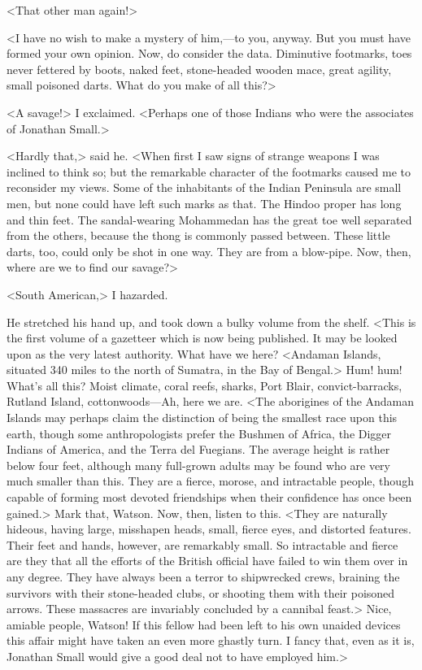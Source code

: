<That other man again!>

<I have no wish to make a mystery of him,—to you, anyway. But you must have formed your own opinion. Now, do consider the data. Diminutive footmarks, toes never fettered by boots, naked feet, stone-headed wooden mace, great agility, small poisoned darts. What do you make of all this?>

<A savage!> I exclaimed. <Perhaps one of those Indians who were the associates of Jonathan Small.>

<Hardly that,> said he. <When first I saw signs of strange weapons I was inclined to think so; but the remarkable character of the footmarks caused me to reconsider my views. Some of the inhabitants of the Indian Peninsula are small men, but none could have left such marks as that. The Hindoo proper has long and thin feet. The sandal-wearing Mohammedan has the great toe well separated from the others, because the thong is commonly passed between. These little darts, too, could only be shot in one way. They are from a blow-pipe. Now, then, where are we to find our savage?>

<South American,> I hazarded.

He stretched his hand up, and took down a bulky volume from the shelf. <This is the first volume of a gazetteer which is now being published. It may be looked upon as the very latest authority. What have we here? <Andaman Islands, situated 340 miles to the north of Sumatra, in the Bay of Bengal.> Hum! hum! What's all this? Moist climate, coral reefs, sharks, Port Blair, convict-barracks, Rutland Island, cottonwoods—Ah, here we are. <The aborigines of the Andaman Islands may perhaps claim the distinction of being the smallest race upon this earth, though some anthropologists prefer the Bushmen of Africa, the Digger Indians of America, and the Terra del Fuegians. The average height is rather below four feet, although many full-grown adults may be found who are very much smaller than this. They are a fierce, morose, and intractable people, though capable of forming most devoted friendships when their confidence has once been gained.> Mark that, Watson. Now, then, listen to this. <They are naturally hideous, having large, misshapen heads, small, fierce eyes, and distorted features. Their feet and hands, however, are remarkably small. So intractable and fierce are they that all the efforts of the British official have failed to win them over in any degree. They have always been a terror to shipwrecked crews, braining the survivors with their stone-headed clubs, or shooting them with their poisoned arrows. These massacres are invariably concluded by a cannibal feast.> Nice, amiable people, Watson! If this fellow had been left to his own unaided devices this affair might have taken an even more ghastly turn. I fancy that, even as it is, Jonathan Small would give a good deal not to have employed him.>

